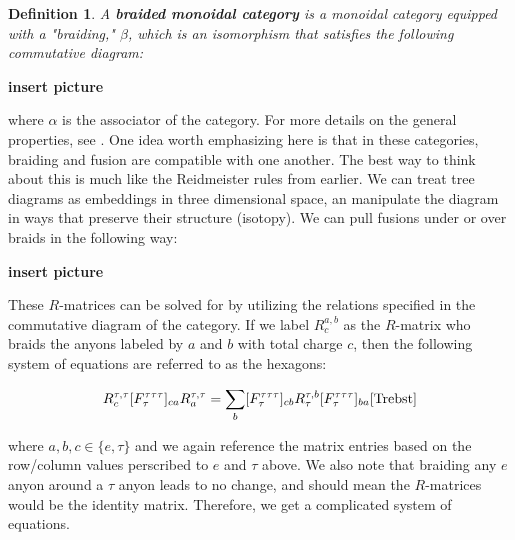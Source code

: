 \documentclass[10pt]{ucthesis}
\newtheorem{definition}{Definition}[chapter]
\begin{document}
\begin{definition}
	A \textbf{braided monoidal category} is a monoidal category equipped with a "braiding," $\beta$, which is an isomorphism that satisfies the following commutative diagram:
\end{definition}

\textbf{insert picture}

where $\alpha$ is the associator of the category. For more details on the general properties, see \cite{Joyal}. One idea worth emphasizing here is that in these categories, braiding and fusion are compatible with one another. The best way to think about this is much like the Reidmeister rules from earlier. We can treat tree diagrams as embeddings in three dimensional space, an manipulate the diagram in ways that preserve their structure (isotopy). We can pull fusions under or over braids in the following way:

\textbf{insert picture}


These $R$-matrices can be solved for by utilizing the relations specified in the commutative diagram of the category. If we label $R^{a,b}_c$ as the $R$-matrix who braids the anyons labeled by $a$ and $b$ with total charge $c$, then the following system of equations are referred to as the hexagons:

\begin{equation}
	\begin{aligned}
		R^{\tau,\tau}_c [F^{\tau\tau\tau}_\tau]_{ca}R^{\tau,\tau}_a = \sum_b [F^{\tau\tau\tau}_\tau]_{cb}R^{\tau,b}_\tau[F^{\tau\tau\tau}_\tau]_{ba} \cite{Trebst}
	\end{aligned}
\end{equation}

where $a,b,c\in\{e,\tau\}$ and we again reference the matrix entries based on the row/column values perscribed to $e$ and $\tau$ above. We also note that braiding any $e$ anyon around a $\tau$ anyon leads to no change, and should mean the $R$-matrices would be the identity matrix. Therefore, we get a complicated system of equations.
\end{document}
